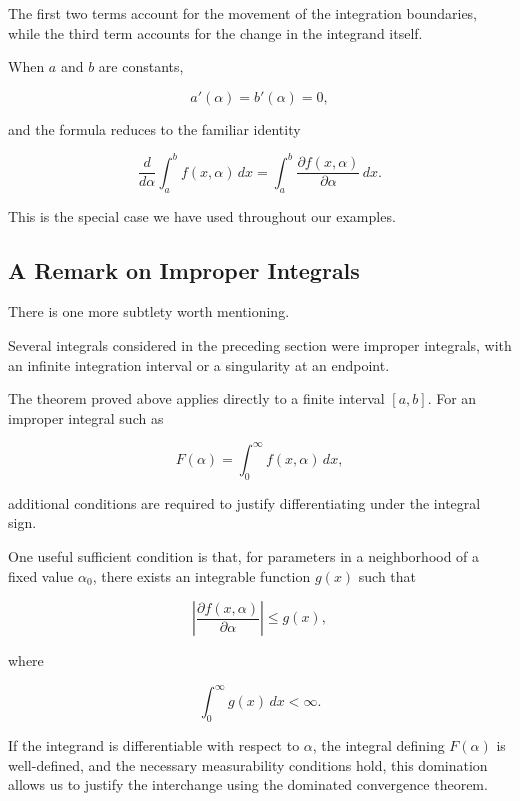 \documentclass[11pt,a4paper]{article}
\theoremstyle{definition}
\theoremstyle{remark}
\begin{document}
The first two terms account
for the movement of the
integration boundaries,
while the third term
accounts for the change
in the integrand itself.

When $a$ and $b$ are
constants,

\[
    a'(\alpha)=b'(\alpha)=0,
\]

and the formula reduces
to the familiar identity

\[
    \frac{d}{d\alpha}
    \int_a^b f(x,\alpha)\,dx
    =
    \int_a^b
    \frac{\partial f(x,\alpha)}
         {\partial\alpha}\,dx.
\]

This is the special case
we have used throughout
our examples.

\subsection{A Remark on Improper Integrals}

There is one more subtlety
worth mentioning.

Several integrals considered
in the preceding section
were improper integrals,
with an infinite integration
interval or a singularity
at an endpoint.

The theorem proved above
applies directly to a
finite interval $[a,b]$.
For an improper integral
such as

\[
    F(\alpha)
    =
    \int_0^\infty f(x,\alpha)\,dx,
\]

additional conditions are
required to justify
differentiating under the
integral sign.

One useful sufficient
condition is that, for
parameters in a neighborhood
of a fixed value $\alpha_0$,
there exists an integrable
function $g(x)$ such that

\begin{equation}
    \left|
    \frac{\partial f(x,\alpha)}
         {\partial\alpha}
    \right|
    \leq g(x),
    \label{eq:dominating_function}
\end{equation}

where

\[
    \int_0^\infty g(x)\,dx<\infty.
\]

If the integrand is
differentiable with respect
to $\alpha$, the integral
defining $F(\alpha)$ is
well-defined, and the
necessary measurability
conditions hold, this
domination allows us to
justify the interchange
using the dominated
convergence theorem.
\end{document}

